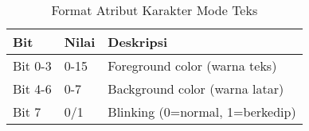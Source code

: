 \documentclass[../main.tex]{subfiles}
\begin{document}
            \begin{table}[H]
                \centering
                \caption{Format Atribut Karakter Mode Teks}
                \begin{tabular}{|p{1.5cm}|p{2cm}|p{7cm}|}
                \hline
                \textbf{Bit} & \textbf{Nilai} & \textbf{Deskripsi} \\
                \hline
                Bit 0-3 & 0-15 & Foreground color (warna teks) \\
                \hline
                Bit 4-6 & 0-7 & Background color (warna latar) \\
                \hline
                Bit 7 & 0/1 & Blinking (0=normal, 1=berkedip) \\
                \hline
                \end{tabular}
            \end{table}
\end{document}
